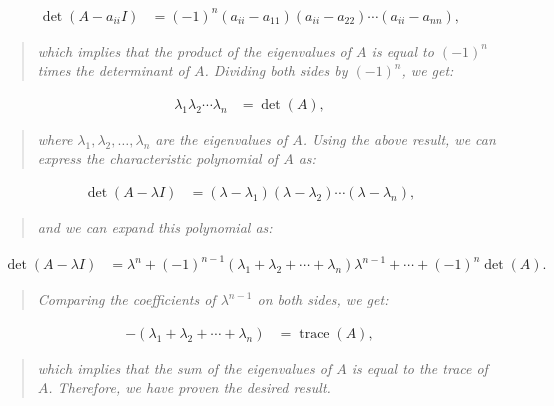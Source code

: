 \documentclass[a4paper]{article}
\begin{document}
\begin{itemize}
            \begin{align*} \det(A - a_{ii} I) &= (-1)^n (a_{ii} - a_{11})(a_{ii} - a_{22}) \cdots (a_{ii} - a_{nn}), \end{align*}
            
            \begin{quote}
                \emph{which implies that the product of the eigenvalues of $A$ is equal to $(-1)^n$ times the determinant of $A$. Dividing both sides by $(-1)^n$, we get:}
            \end{quote}
            
            \begin{align*} \lambda_1 \lambda_2 \cdots \lambda_n &= \det(A), \end{align*}
            
            \begin{quote}
                \emph{where $\lambda_1, \lambda_2, \ldots, \lambda_n$ are the eigenvalues of $A$.}
                \emph{ Using the above result, we can express the characteristic polynomial of $A$ as:}
            \end{quote}
            
            \begin{align*} \det(A - \lambda I) &= (\lambda - \lambda_1)(\lambda - \lambda_2) \cdots (\lambda - \lambda_n), \end{align*}
            
            \begin{quote}
                \emph{and we can expand this polynomial as:}
            \end{quote}
            
            \begin{align*} \det(A - \lambda I) &= \lambda^n + (-1)^{n-1}(\lambda_1 + \lambda_2 + \cdots + \lambda_n) \lambda^{n-1} + \cdots + (-1)^n \det(A). \end{align*}
            
            \begin{quote}
                \emph{Comparing the coefficients of $\lambda^{n-1}$ on both sides, we get:}
            \end{quote}
            
            \begin{align*} -(\lambda_1 + \lambda_2 + \cdots + \lambda_n) &= \operatorname{trace}(A), \end{align*}
            
            \begin{quote}
                \emph{which implies that the sum of the eigenvalues of $A$ is equal to the trace of $A$. Therefore, we have proven the desired result.}
            \end{quote}
            \vspace*{6\baselineskip}


\end{itemize}
\end{document}
